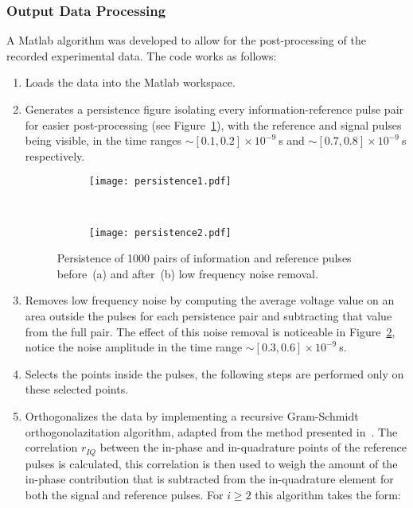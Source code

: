 \subsubsection{Output Data Processing}

A Matlab algorithm was developed to allow for the post-processing of the recorded experimental data. The code works as follows:
\begin{enumerate}
\item Loads the data into the Matlab workspace.
\item Generates a persistence figure isolating every information-reference pulse pair for easier post-processing (see Figure~\ref{fig:persistence1}), with the reference and signal pulses being visible, in the time ranges $\sim[0.1,0.2]\times10^{-9}~$s and $\sim[0.7,0.8]\times10^{-9}~$s respectively.
\begin{figure}[h]
\centering
\begin{subfigure}{.45\linewidth}
\texttt{[image: persistence1.pdf]}
\caption{}
\label{fig:persistence1}
\end{subfigure}
~
\begin{subfigure}{.45\linewidth}
\texttt{[image: persistence2.pdf]}
\caption{}
\label{fig:persistence2}
\end{subfigure}
\caption{Persistence of 1000 pairs of information and reference pulses before~(a) and after~(b) low frequency noise removal.}
\label{fig:persistence}
\end{figure}
\item Removes low frequency noise by computing the average voltage value on an area outside the pulses for each persistence pair and subtracting that value from the full pair. The effect of this noise removal is noticeable in Figure~\ref{fig:persistence2}, notice the noise amplitude in the time range $\sim[0.3,0.6]\times10^{-9}~$s.
\item Selects the points inside the pulses, the following steps are performed only on these selected points.
\item Orthogonalizes the data by implementing a recursive Gram-Schmidt orthogonolazitation algorithm, adapted from the method presented in~\cite{huang2001recursive}. The correlation $r_{IQ}$ between the in-phase and in-quadrature points of the reference pulses is calculated, this correlation is then used to weigh the amount of the in-phase contribution that is subtracted from the in-quadrature element for both the signal and reference pulses. For $i\geq2$ this algorithm takes the form:

\end{enumerate}
